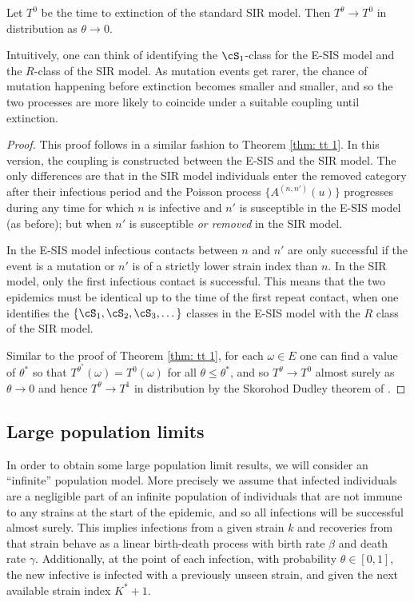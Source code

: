 \documentclass[review]{elsarticle}
\begin{document}
\begin{mythm}\label{thm: tt 0}
	Let $T^0$ be the time to extinction of the standard SIR model. Then $T^{\theta} \rightarrow T^0$ in distribution as $\theta \rightarrow 0$.
\end{mythm}
Intuitively, one can think of identifying the $\cS_1$-class for the E-SIS model 
and the $R$-class of the SIR model. As mutation events get rarer, the chance of mutation happening before extinction becomes smaller and smaller, and so the two processes are more likely to coincide under a suitable coupling until extinction.
\begin{proof}
This proof follows in a similar fashion to Theorem \ref{thm: tt 1}. In this version, the coupling is constructed between the E-SIS and the SIR model. The only differences are that in the SIR model individuals enter the removed category after their infectious period and the Poisson process $\{A^{(n,n')}(u)\}$ progresses during any time for which $n$ is infective and $n'$ is susceptible in the E-SIS model (as before); but when $n'$ is susceptible \emph{or removed} in the SIR model. 

In the E-SIS model infectious contacts between $n$ and $n'$ are only successful if the event is a mutation or $n'$ is of a strictly lower strain index than $n$. In the SIR model, only the first infectious contact is successful. This means that the two epidemics must be identical up to the time of the first repeat contact, when one identifies the $\{\cS_1, \cS_2, \cS_3, \dots\}$ classes in the E-SIS model with the $R$ class of the SIR model.

Similar to the proof of Theorem \ref{thm: tt 1}, for each $\omega\in E$ one can find a value of $\theta^*$ so that $T^{\theta^*}(\omega) = T^0(\omega)$ for all $\theta \leq \theta^*$, and so $T^{\theta} \rightarrow T^0$ almost surely as $\theta\rightarrow 0$ and hence $T^\theta\rightarrow T^1$ in distribution by the Skorohod Dudley theorem of \cite{dudley1968}.
\end{proof}

\subsection{Large population limits}\label{subsec: bdps}
In order to obtain some large population limit results, we will consider an ``infinite'' population model. More precisely we assume that infected individuals are a negligible part of an infinite population of individuals that are not immune to any strains at the start of the epidemic, and so all infections will be successful almost surely.  This implies infections from a given strain $k$ and recoveries from that strain behave as a linear birth-death process with birth rate $\beta$ and death rate $\gamma$. Additionally, at the point of each infection, with probability $\theta \in [0,1]$, the new infective is infected with a previously unseen strain, and given the next available strain index $K^* + 1$.
\end{document}
